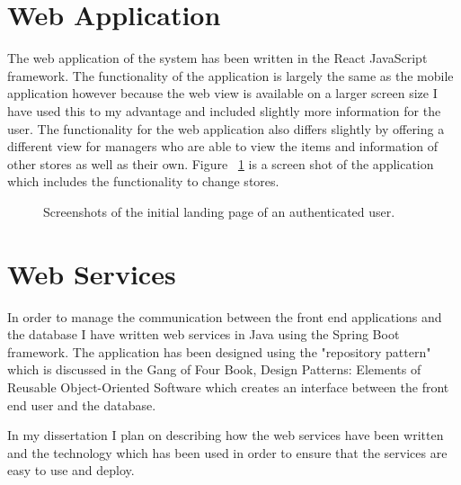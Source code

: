 \documentclass[a4paper,11pt]{report}
\begin{document}
\section{Web Application}
The web application of the system has been written in the React JavaScript framework. The functionality of the application is largely the same as the mobile application however because the web view is available on a larger screen size I have used this to my advantage and included slightly more information for the user. 
The functionality for the web application also differs slightly by offering a different view for managers who are able to view the items and information of other stores as well as their own. 
Figure ~\ref{fig:WebUi} is a screen shot of the application which includes the functionality to change stores.

\begin{figure}[H]
    \centering
    \caption{Screenshots of the initial landing page of an authenticated user.}
    \label{fig:WebUi}
\end{figure}

\section{Web Services}
In order to manage the communication between the front end applications and the database I have written web services in Java using the Spring Boot framework. 
The application has been designed using the "repository pattern" which is discussed in the Gang of Four Book, Design Patterns: Elements of Reusable Object-Oriented Software\cite{gamma1994design} which creates an interface between the front end user and the database.

In my dissertation I plan on describing how the web services have been written and the technology which has been used in order to ensure that the services are easy to use and deploy.
\end{document}
